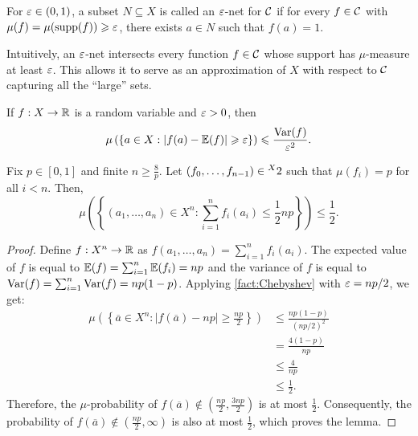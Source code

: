\begin{definition}
    For $\varepsilon\in(0,1)$, a subset $N \subseteq X$ is called an $\varepsilon$-net for $\mathcal{C}$ if for every $f\in \mathcal{C}$ with $\mu(f)=\mu(\operatorname{supp}(f))\geqslant \varepsilon$, there exists $a\in N$ such that $f(a)=1$.
\end{definition} 

Intuitively, an $\varepsilon$-net intersects every function $f\in \mathcal{C}$ whose support has $\mu$-measure at least $\varepsilon$. This allows it to serve as an approximation of $X$ with respect to $\mathcal{C}$ capturing all the \enquote{large} sets.

\begin{fact}
\label{fact:Chebyshev}
    If $f:X\rightarrow \mathbb{R}$ is a random variable and $\varepsilon >0$, then 
    $$\mu\left(\{a\in X : |f(a)-\operatorname{\mathbb{E}}(f)|\geqslant \varepsilon\}\right)\leqslant \frac{\operatorname{Var}(f)}{\varepsilon^2}.$$
\end{fact}

\begin{lemma}
    \label{lem:suppfUB}
    Fix $p\in [0,1]$ and finite $n\geq \frac{8}{p}$. Let $(f_0,\ldots,f_{n-1})\in \prescript{X}{}{2}$ such that $\mu(f_i)=p$ for all $i<n$. Then,
    $$\mu\left(\left\{
    (a_1,\ldots,a_n) \in X^n : \sum^n_{i=1} f_i(a_i)\leq \frac{1}{2}np
    \right\}\right) \leq \frac{1}{2}.$$
\end{lemma}
\begin{proof}
    Define $f:X^n\rightarrow \mathbb{R}$ as $f(a_1,\ldots,a_n)=\sum_{i=1}^n f_i(a_i)$. The expected value of $f$ is equal to $\operatorname{\mathbb{E}}(f)=\sum_{i=1}^n \operatorname{\mathbb{E}}(f_i)=np$ and the variance of $f$ is equal to $\operatorname{Var}(f)=\sum_{i=1}^n \operatorname{Var}(f)=np(1-p)$. Applying \cref{fact:Chebyshev} with $\varepsilon=np/2$, we get:
    \begin{align*}
        \mu\left(\left\{\overline{a}\in X^n : |f(\overline{a})-np|\geq \frac{np}{2}\right\}\right) & \leq \frac{np(1-p)}{(np/2)^2} \\
        & = \frac{4(1-p)}{np} \\
        & \leq \frac{4}{np} \\
        & \leq \frac{1}{2}.
    \end{align*}
    Therefore, the $\mu$-probability of $f(\overline{a})\not\in \left(\frac{np}{2},\frac{3np}{2}\right)$ is at most $\frac{1}{2}$. Consequently, the probability of $f(\overline{a})\not\in(\frac{np}{2},\infty)$ is also at most $\frac{1}{2}$, which proves the lemma.
\end{proof}

